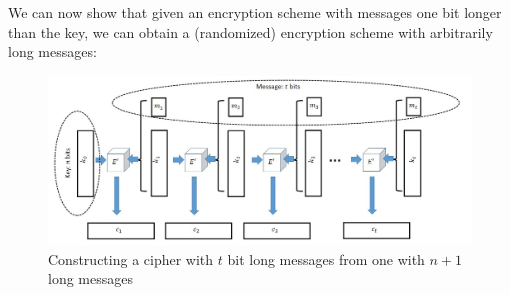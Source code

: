 We can now show that given an encryption scheme with messages one bit
longer than the key, we can obtain a (randomized) encryption scheme with
arbitrarily long messages:

\hypertarget{lengthextendthm}{}


\begin{figure}
\centering
\includegraphics[width=\textwidth, height=0.25\paperheight, keepaspectratio]{../figure/length-extension.jpg}
\caption{Constructing a cipher with \(t\) bit long messages from one
with \(n+1\) long messages}
\label{tmplabelfig}
\end{figure}

